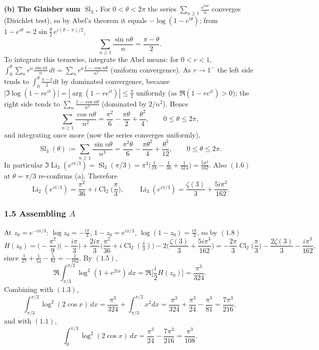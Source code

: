 \documentclass[11pt]{article}
\theoremstyle{remark}
\begin{document}
\textbf{(b) The Glaisher sum $\operatorname{Sl}_3$.} For $0<\theta<2\pi$ the series $\sum_{n\ge1}\frac{e^{in\theta}}{n}$ converges (Dirichlet test), so by Abel's theorem it equals $-\log(1-e^{i\theta})$; from $1-e^{i\theta}=2\sin\frac\theta2\,e^{i(\theta-\pi)/2}$,
\[
\sum_{n\ge1}\frac{\sin n\theta}{n}=\frac{\pi-\theta}{2}.
\]
To integrate this termwise, integrate the Abel means: for $0<r<1$, $\int_0^\theta\sum_n r^n\frac{\sin nt}{n}\,dt=\sum_n r^n\frac{1-\cos n\theta}{n^2}$ (uniform convergence). As $r\to1^-$ the left side tends to $\int_0^\theta\frac{\pi-t}{2}dt$ by dominated convergence, because $\big|\Im\log(1-re^{it})\big|=|\arg(1-re^{it})|\le\frac\pi2$ uniformly (as $\Re(1-re^{it})>0$); the right side tends to $\sum_n\frac{1-\cos n\theta}{n^2}$ (dominated by $2/n^2$). Hence
\begin{equation*}
\sum_{n\ge1}\frac{\cos n\theta}{n^2}=\frac{\pi^2}{6}-\frac{\pi\theta}{2}+\frac{\theta^2}{4},\qquad 0\le\theta\le2\pi, \tag{1.6}
\end{equation*}
and integrating once more (now the series converges uniformly),
\begin{equation*}
\operatorname{Sl}_3(\theta):=\sum_{n\ge1}\frac{\sin n\theta}{n^3}=\frac{\pi^2\theta}{6}-\frac{\pi\theta^2}{4}+\frac{\theta^3}{12},\qquad 0\le\theta\le2\pi. \tag{1.7}
\end{equation*}
In particular $\Im\operatorname{Li}_3(e^{i\pi/3})=\operatorname{Sl}_3(\pi/3)=\pi^3\big(\frac1{18}-\frac1{36}+\frac1{324}\big)=\frac{5\pi^3}{162}$. Also $(1.6)$ at $\theta=\pi/3$ re-confirms (a). Therefore
\begin{equation*}
\operatorname{Li}_2(e^{i\pi/3})=\frac{\pi^2}{36}+i\operatorname{Cl}_2\!\Big(\frac\pi3\Big),\qquad
\operatorname{Li}_3(e^{i\pi/3})=\frac{\zeta(3)}{3}+\frac{5i\pi^3}{162}. \tag{1.8}
\end{equation*}

\subsubsection*{1.5 Assembling $A$}

At $z_0=e^{-i\pi/3}$: $\log z_0=-\frac{i\pi}{3}$, $1-z_0=e^{i\pi/3}$, $\log(1-z_0)=\frac{i\pi}{3}$, so by $(1.8)$
\[
H(z_0)=\Big(-\frac{\pi^2}{9}\Big)\Big(-\frac{i\pi}{3}\Big)+\frac{2i\pi}{3}\Big(\frac{\pi^2}{36}+i\operatorname{Cl}_2(\tfrac\pi3)\Big)-2\Big(\frac{\zeta(3)}{3}+\frac{5i\pi^3}{162}\Big)
=-\frac{2\pi}{3}\operatorname{Cl}_2\!\Big(\frac\pi3\Big)-\frac{2\zeta(3)}{3}-\frac{i\pi^3}{162},
\]
since $\frac{1}{27}+\frac{1}{54}-\frac{5}{81}=-\frac1{162}$. By $(1.5)$,
\[
\Re\int_{\pi/3}^{\pi/2}\log^2(1+e^{2ix})\,dx=\Re\Big[\frac i2 H(z_0)\Big]=\frac{\pi^3}{324}.
\]
Combining with $(1.3)$,
\[
\int_{\pi/3}^{\pi/2}\log^2(2\cos x)\,dx=\frac{\pi^3}{324}+\int_{\pi/3}^{\pi/2}x^2dx
=\frac{\pi^3}{324}+\frac{\pi^3}{24}-\frac{\pi^3}{81}=\frac{7\pi^3}{216},
\]
and with $(1.1)$,
\begin{equation*}
\int_0^{\pi/3}\log^2(2\cos x)\,dx=\frac{\pi^3}{24}-\frac{7\pi^3}{216}=\frac{\pi^3}{108}. \tag{1.9}
\end{equation*}
\end{document}
